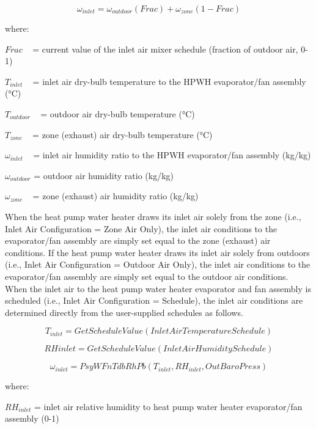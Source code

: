 \begin{equation}
{\omega_{inlet}} = {\omega_{outdoor}}\left( {Frac} \right) + {\omega_{zone}}\left( {1 - Frac} \right)
\end{equation}

where:

\(Frac\) ~ = current value of the inlet air mixer schedule (fraction of outdoor air, 0-1)

\({T_{inlet}}\) ~ = inlet air dry-bulb temperature to the HPWH evaporator/fan assembly (°C)

\({T_{outdoor}}\) ~ = outdoor air dry-bulb temperature (°C)

\({T_{zone}}\) ~ = zone (exhaust) air dry-bulb temperature (°C)

\({\omega_{inlet}}\) ~ = inlet air humidity ratio to the HPWH evaporator/fan assembly (kg/kg)

\({\omega_{outdoor}}\) = outdoor air humidity ratio (kg/kg)

\({\omega_{zone}}\) ~ = zone (exhaust) air humidity ratio (kg/kg)

When the heat pump water heater draws its inlet air solely from the zone (i.e., Inlet Air Configuration = Zone Air Only), the inlet air conditions to the evaporator/fan assembly are simply set equal to the zone (exhaust) air conditions. If the heat pump water heater draws its inlet air solely from outdoors (i.e., Inlet Air Configuration = Outdoor Air Only), the inlet air conditions to the evaporator/fan assembly are simply set equal to the outdoor air conditions. When the inlet air to the heat pump water heater evaporator and fan assembly is scheduled (i.e., Inlet Air Configuration = Schedule), the inlet air conditions are determined directly from the user-supplied schedules as follows.

\begin{equation}
{T_{inlet}} = GetScheduleValue(InletAirTemperatureSchedule)
\end{equation}

\begin{equation}
RHinlet = GetScheduleValue(InletAirHumiditySchedule)
\end{equation}

\begin{equation}
{\omega_{inlet}} = PsyWFnTdbRhPb({T_{inlet}},R{H_{inlet}},OutBaroPress)
\end{equation}

where:

\(R{H_{inlet}}\) = inlet air relative humidity to heat pump water heater evaporator/fan assembly (0-1)

